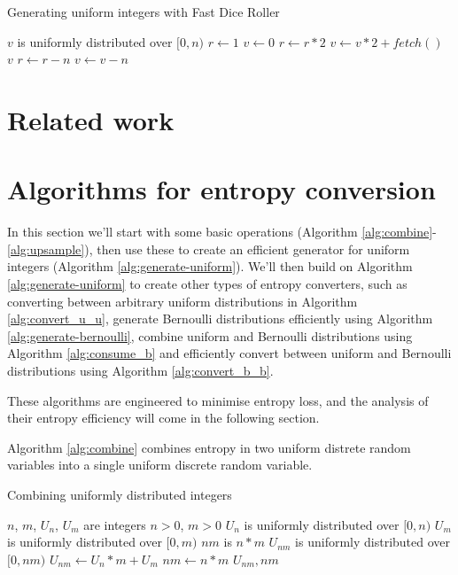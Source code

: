 \documentclass[12pt]{article}
\begin{document}
\begin{algorithm}
\caption{Generating uniform integers with Fast Dice Roller}
    \label{alg:fast-dice-roller}
\begin{algorithmic}[1]
    \Ensure $v$ is uniformly distributed over $[0,n)$
    \State $r \gets 1$
    \State $v \gets 0$
    \Loop
            \State $r \gets r * 2$
            \State $v \gets v * 2 + fetch()$
        \EndWhile
            \State \Return $v$
        \EndIf
        \State $r \gets r-n$
        \State $v \gets v-n$
    \EndLoop
\EndProcedure
\end{algorithmic}
\end{algorithm}


\section{Related work}


\section{Algorithms for entropy conversion}

In this section we'll start with some basic operations (Algorithm \ref{alg:combine}-\ref{alg:upsample}), then use these to create an efficient generator for uniform integers (Algorithm \ref{alg:generate-uniform}). We'll then build on Algorithm \ref{alg:generate-uniform} to create other types of entropy converters, such as converting between arbitrary uniform distributions in Algorithm \ref{alg:convert_u_u}, generate Bernoulli distributions efficiently using Algorithm \ref{alg:generate-bernoulli}, combine uniform and Bernoulli distributions using Algorithm \ref{alg:consume_b} and efficiently convert between uniform and Bernoulli distributions using Algorithm \ref{alg:convert_b_b}.

These algorithms are engineered to minimise entropy loss, and the analysis of their entropy efficiency will come in the following section.

Algorithm \ref{alg:combine} combines entropy in two uniform distrete random variables into a single uniform discrete random variable.

\begin{algorithm}
\caption{Combining uniformly distributed integers}
\label{alg:combine}
\begin{algorithmic}[1]
    \Require $n$, $m$, $U_n$, $U_m$ are integers
    \Require $n>0$, $m>0$
    \Require $U_n$ is uniformly distributed over $[0,n)$
    \Require $U_m$ is uniformly distributed over $[0,m)$
    \Ensure $nm$ is $n * m$
    \Ensure $U_{nm}$ is uniformly distributed over $[0,nm)$
  \State $U_{nm} \gets U_n * m + U_m$
  \State $nm \gets n * m$
  \State \Return $U_{nm}, nm$
\EndProcedure
\end{algorithmic}
\end{algorithm}
\end{document}
